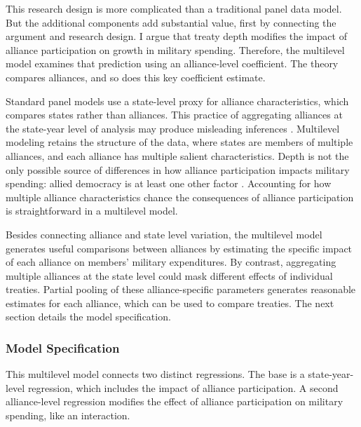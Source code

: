 \documentclass[12pt]{article}
\begin{document}
This research design is more complicated than a traditional panel data model. 
But the additional components add substantial value, first by connecting the argument and research design.%
I argue that treaty depth modifies the impact of alliance participation on growth in military spending. 
Therefore, the multilevel model examines that prediction using an alliance-level coefficient.
The theory compares alliances, and so does this key coefficient estimate. 


Standard panel models use a state-level proxy for alliance characteristics, which compares states rather than alliances.
This practice of aggregating alliances at the state-year level of analysis may produce misleading inferences \citep{McElreath2016}.
Multilevel modeling retains the structure of the data, where states are members of multiple alliances, and each alliance has multiple salient characteristics. 
Depth is not the only possible source of differences in how alliance participation impacts military spending: allied democracy is at least one other factor \citep{DigiuseppePoast2016}. 
Accounting for how multiple alliance characteristics chance the consequences of alliance participation is straightforward in a multilevel model. 


Besides connecting alliance and state level variation, the multilevel model generates useful comparisons between alliances by estimating the specific impact of each alliance on members' military expenditures. 
By contrast, aggregating multiple alliances at the state level could mask different effects of individual treaties. 
Partial pooling of these alliance-specific parameters generates reasonable estimates for each alliance, which can be used to compare treaties. 
The next section details the model specification. 
 


\subsubsection{Model Specification} 

This multilevel model connects two distinct regressions. 
The base is a state-year-level regression, which includes the impact of alliance participation.
A second alliance-level regression modifies the effect of alliance participation on military spending, like an interaction. 
\end{document}
